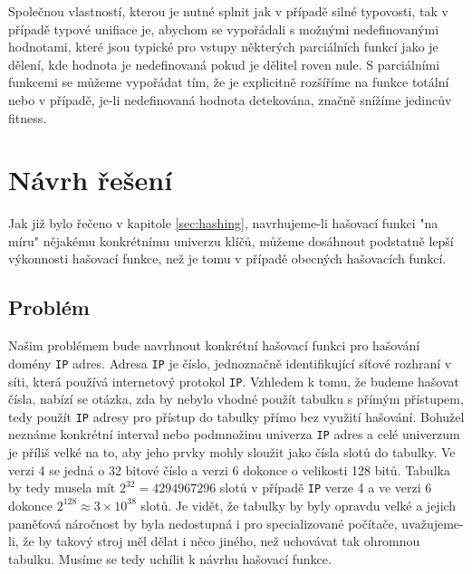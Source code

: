 Společnou vlastností, kterou je nutné splnit jak v případě silné typovosti, tak v případě
typové unifiace je, abychom se vypořádali s možnými
nedefinovanými hodnotami, které jsou typické pro vstupy některých parciálních funkcí
jako je dělení, kde hodnota je nedefinovaná pokud je dělitel roven nule.
S parciálními funkcemi se můžeme vypořádat tím, že je explicitně rozšíříme na funkce
totální nebo v případě, je-li nedefinovaná hodnota detekována, značně snížíme jedincův 
fitness.

\chapter{Návrh řešení}
\label{sec:solution_design}

Jak již bylo řečeno v kapitole \ref{sec:hashing}, navrhujeme-li hašovací funkci "na
míru" nějakému konkrétnímu univerzu klíčů, můžeme dosáhnout podstatně lepší 
výkonnosti hašovací funkce, než je tomu v případě obecných hašovacích funkcí.

\section{Problém}
Našim problémem bude navrhnout konkrétní hašovací funkci pro hašování domény
\texttt{IP} adres. Adresa \texttt{IP} je číslo, jednoznačně identifikující síťové
rozhraní v síti, která používá internetový protokol \texttt{IP}. Vzhledem k tomu,
že budeme hašovat čísla, nabízí se otázka, zda by nebylo vhodné použít tabulku
s přímým přístupem, tedy použít \texttt{IP} adresy pro přístup do tabulky
přímo bez využití hašování. Bohužel neznáme konkrétní interval nebo podmnožinu
univerza \texttt{IP} adres a celé univerzum je příliš velké na to, aby jeho 
prvky mohly sloužit jako čísla slotů do tabulky. Ve verzi 4 se jedná o 32 
bitové číslo a verzi 6 dokonce o velikosti 128 bitů. Tabulka by tedy musela
mít $2^{32} = 4 294 967 296$ slotů v případě  \texttt{IP} verze 4 a ve verzi 6
dokonce $2^{128} \approx 3 \times 10^{38}$
slotů. Je vidět, že tabulky by byly opravdu velké a jejich paměťová náročnost
by byla nedostupná i pro specializované počítače, uvažujeme-li, že by takový
stroj měl dělat i něco jiného, než uchovávat tak ohromnou tabulku. Musíme se
tedy uchílit k návrhu hašovací funkce.

